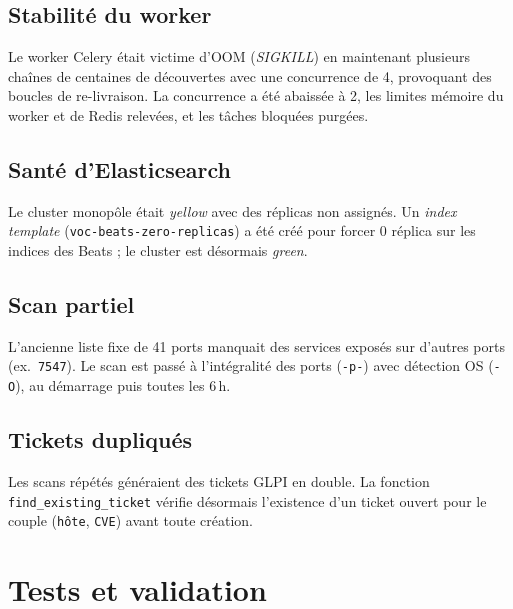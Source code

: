 \subsection{Stabilit\'e du worker}

Le worker Celery \'etait victime d'OOM (\emph{SIGKILL}) en maintenant
plusieurs cha\^ines de centaines de d\'ecouvertes avec une concurrence de 4,
provoquant des boucles de re-livraison. La concurrence a \'et\'e abaiss\'ee
\`a 2, les limites m\'emoire du worker et de Redis relev\'ees, et les
t\^aches bloqu\'ees purg\'ees.

\subsection{Sant\'e d'Elasticsearch}

Le cluster monop\^ole \'etait \emph{yellow} avec des r\'eplicas non
assign\'es. Un \emph{index template} (\texttt{voc-beats-zero-replicas}) a
\'et\'e cr\'e\'e pour forcer 0 r\'eplica sur les indices des Beats ; le
cluster est d\'esormais \emph{green}.

\subsection{Scan partiel}

L'ancienne liste fixe de 41 ports manquait des services expos\'es sur
d'autres ports (ex.\ \texttt{7547}). Le scan est pass\'e \`a
l'int\'egralit\'e des ports (\texttt{-p-}) avec d\'etection OS
(\texttt{-O}), au d\'emarrage puis toutes les 6\,h.

\subsection{Tickets dupliqu\'es}

Les scans r\'ep\'et\'es g\'en\'eraient des tickets GLPI en double. La
fonction \texttt{find\_existing\_ticket} v\'erifie d\'esormais l'existence
d'un ticket ouvert pour le couple (\texttt{h\^ote}, \texttt{CVE}) avant toute
cr\'eation.

\clearpage

\section{Tests et validation}


